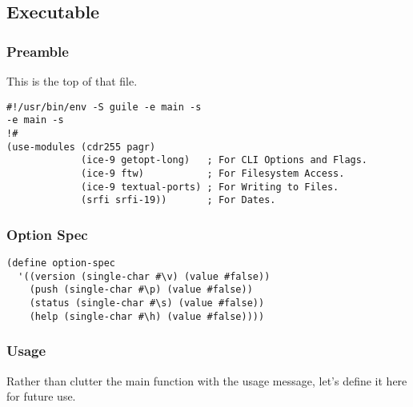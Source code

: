 \documentclass[11pt]{article}
\begin{document}
\subsection{Executable}
\label{sec:org0fcf478}
\subsubsection{Preamble}
\label{sec:org81f0825}
This is the top of that file.

\begin{verbatim}
#!/usr/bin/env -S guile -e main -s
-e main -s
!#
(use-modules (cdr255 pagr)
             (ice-9 getopt-long)   ; For CLI Options and Flags.
             (ice-9 ftw)           ; For Filesystem Access.
             (ice-9 textual-ports) ; For Writing to Files.
             (srfi srfi-19))       ; For Dates.
\end{verbatim}

\subsubsection{Option Spec}
\label{sec:org6a31839}
\begin{verbatim}
(define option-spec
  '((version (single-char #\v) (value #false))
    (push (single-char #\p) (value #false))
    (status (single-char #\s) (value #false))
    (help (single-char #\h) (value #false))))
\end{verbatim}

\subsubsection{Usage}
\label{sec:orgadcee8f}
Rather than clutter the main function with the usage message, let's define it
here for future use.
\end{document}

